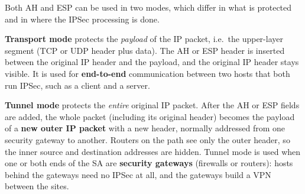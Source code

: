 Both AH and ESP can be used in two modes, which differ in what is protected and in where the IPSec processing is done.

\textbf{Transport mode} protects the \emph{payload} of the IP packet, i.e.\ the upper-layer segment (TCP or UDP header plus data). The AH or ESP header is inserted between the original IP header and the payload, and the original IP header stays visible. It is used for \textbf{end-to-end} communication between two hosts that both run IPSec, such as a client and a server.

\textbf{Tunnel mode} protects the \emph{entire} original IP packet. After the AH or ESP fields are added, the whole packet (including its original header) becomes the payload of a \textbf{new outer IP packet} with a new header, normally addressed from one security gateway to another. Routers on the path see only the outer header, so the inner source and destination addresses are hidden. Tunnel mode is used when one or both ends of the SA are \textbf{security gateways} (firewalls or routers): hosts behind the gateways need no IPSec at all, and the gateways build a VPN between the sites.

